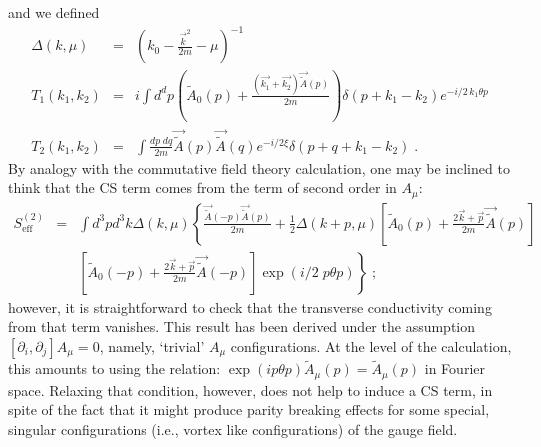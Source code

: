 \documentclass[a4paper,12pt]{article}
\begin{document}
and  we defined
\begin{eqnarray*}
\Delta(k, \mu) & = & \left( k_0-\frac{\vec{k}^2}{2m} - \mu \right)^{-1} \\
T_1 (k_1,k_2)& = & i\int d^d p \left( 
  \tilde A_0(p)  + \frac{(\vec{k_1}+\vec{k_2}) \vec{
 \tilde A} (p)} {2m} \right) 
\delta(p+k_1-k_2) e^{-i/2\,k_1 \theta p} \\
T_2 (k_1,k_2)& = & \int \frac{dp\;dq}{2m} \vec{\tilde A}(p)\vec{\tilde A}(q)
e^{-i/2 \xi} \delta (p+q+k_1-k_2)\;.
\end{eqnarray*}
By analogy with the commutative field theory calculation, one may be
inclined to think that the CS term comes from the term of second order
in $A_\mu$:
\begin{eqnarray}
S_\mathrm{eff}^{(2)} & = & \int d^3p d^3k 
\Delta(k,\mu) \left\{ \frac{\vec{\tilde A}(-p) \vec{\tilde A}(p)}{2m}
+\frac{1}{2}\Delta(k+p,\mu)\left[\tilde A_0(p) + \frac{2\vec{k}+\vec{p}}{2m} 
\vec{\tilde A}(p)\right]
\right.
\nonumber \\
& &
\label{seff2}
\left.
\left[
\tilde A_0(-p) + \frac{2\vec{k}+\vec{p}}{2m} \vec{\tilde A}(-p)
\right] \exp (i/2 \; p \theta p)
\right\}\;;
\end{eqnarray}
however, it is straightforward to check that the transverse
conductivity coming from that term vanishes. This result has been
derived under the assumption $[\partial_i,\partial_j] A_\mu =0$, namely, `trivial'
$A_\mu$ configurations. At the level of the calculation, this amounts to
using the relation: $\exp(i p\theta p) {\widetilde A}_\mu(p) = {\widetilde
  A}_\mu (p)$ in Fourier space. Relaxing that condition, however, does
not help to induce a CS term, in spite of the fact that it might
produce parity breaking effects for some special, singular
configurations (i.e., vortex like configurations) of the gauge field.
\end{document}

